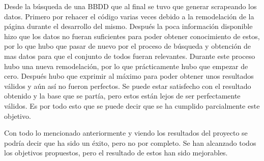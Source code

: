 \begin{itemize}
    Desde la búsqueda de una \acs{BBDD} que al final se tuvo que generar scrapeando los datos. Primero
    por rehacer el código varias veces debido a la remodelación de la página durante el desarrollo
    del mismo. Después la poca información disponible hizo que los datos no fueran suficientes para
    poder obtener conocimiento de estos, por lo que hubo que pasar de nuevo por el proceso de
    búsqueda y obtención de mas datos para que el conjunto de todos fueran relevantes. Durante este
    proceso hubo una nueva remodelación, por lo que prácticamente hubo que empezar de cero. Después
    hubo que exprimir al máximo para poder obtener unos resultados válidos y aún así no fueron perfectos.
    Se puede estar satisfecho con el resultado obtenido y la base que se partía, pero estos están lejos
    de ser perfectamente válidos. Es por todo esto que se puede decir que se ha cumplido parcialmente
    este objetivo.
\end{itemize}

Con todo lo mencionado anteriormente y viendo los resultados del proyecto se podría decir que ha sido
un éxito, pero no por completo. Se han alcanzado todos los objetivos propuestos, pero el resultado
de estos han sido mejorables.


